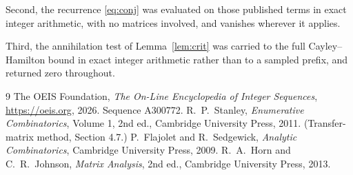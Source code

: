 \documentclass[11pt,a4paper]{article}
\theoremstyle{plain}
\theoremstyle{definition}
\begin{document}
Second, the recurrence \eqref{eq:conj} was evaluated on those published terms in exact
integer arithmetic, with no matrices involved, and vanishes wherever it applies.

Third, the annihilation test of Lemma~\ref{lem:crit} was carried to the full
Cayley--Hamilton bound in exact integer arithmetic rather than to a sampled prefix, and
returned zero throughout.

\begin{thebibliography}{9}
 The OEIS Foundation, \emph{The On-Line Encyclopedia of Integer
Sequences}, \url{https://oeis.org}, 2026. Sequence A300772.
 R.~P.~Stanley, \emph{Enumerative Combinatorics}, Volume 1, 2nd ed.,
Cambridge University Press, 2011. (Transfer-matrix method, Section 4.7.)
 P.~Flajolet and R.~Sedgewick, \emph{Analytic Combinatorics}, Cambridge
University Press, 2009.
 R.~A.~Horn and C.~R.~Johnson, \emph{Matrix Analysis}, 2nd ed., Cambridge
University Press, 2013.
\end{thebibliography}
\end{document}

